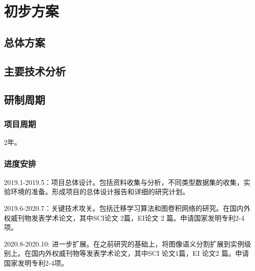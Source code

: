 



\section{初步方案}

\subsection{总体方案}



\subsection{主要技术分析}

\subsection{研制周期}

\subsubsection{项目周期}

2年。

\subsubsection{进度安排}

2019.1-2019.5：项目总体设计。包括资料收集与分析，不同类型数据集的收集，实验环境的准备。形成项目的总体设计报告和详细的研究计划。

2019.6-2020.7：关键技术攻关。包括迁移学习算法和图卷积网络的研究。在国内外权威刊物发表学术论文，其中SCI论文 2篇，EI论文 2 篇。申请国家发明专利2-4项。

2020.8-2020.10: 进一步扩展。在之前研究的基础上，将图像语义分割扩展到实例级别上。在国内外权威刊物等发表学术论文，其中SCI 论文1篇，EI 论文2 篇。申请国家发明专利2-4项。


